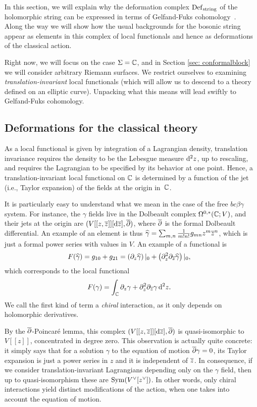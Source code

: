 In this section, we will explain why the deformation complex ${\rm Def}_{\rm string}$ of the holomorphic string 
can be expressed in terms of Gelfand-Fuks cohomology~\cite{Fuks}. 
Along the way we will show how the usual backgrounds for the bosonic string appear as elements in this complex of local functionals and hence as deformations of the classical action. 

Right now, we will focus on the case $\Sigma = \mathbb C$, 
and in Section \ref{sec: conformalblock} we will consider arbitrary Riemann surfaces.
We restrict ourselves to examining {\em translation-invariant} local functionals (which will allow us to descend to a theory defined on an elliptic curve).
Unpacking what this means will lead swiftly to Gelfand-Fuks cohomology.

\subsection{Deformations for the classical theory}

As a local functional is given by integration of a Lagrangian density,
translation invariance requires the density to be the Lebesgue measure ${\rm d}^2 z$, up to rescaling,  
and requires the Lagrangian to be specified by its behavior at one point.
Hence, a translation-invariant local functional on $\mathbb C$ is determined by a function of the jet (i.e., Taylor expansion) of the fields at the origin in~$\mathbb C$. 

It is particularly easy to understand what we mean in the case of the free $bc\beta\gamma$ system.
For instance, the $\gamma$ fields live in the Dolbeault complex $\Omega^{0,*}(\mathbb C ; V)$,
and their jets at the origin are $(V [[z,\overline{z}]] [{\rm d} \overline{z}] , \overline{\partial})$,
where $\overline{\partial}$ is the formal Dolbeault differential. 
An example of an element is thus $\widehat{\gamma} = \sum_{m,n} \frac{1}{m!n!}g_{mn} z^m \overline{z}^n$,
which is just a formal power series with values in $V$.
An example of a functional is
\[
F(\widehat{\gamma}) = g_{10} + g_{21} = \left( \partial_z \widehat{\gamma}\right)|_0 + \left( \partial_z^2 \partial_{\overline{z}} \widehat{\gamma}\right)|_0,
\]
which corresponds to the local functional
\[
F(\gamma) = \int_\mathbb C \partial_z \gamma + \partial_z^2 \partial_{\overline{z}} {\gamma}\,{\rm d}^2 z.
\]
We call the first kind of term a {\em chiral} interaction, as it only depends on holomorphic derivatives.

By the $\overline{\partial}$-Poincar\'{e} lemma, 
this complex $(V [[z,\overline{z}]] [{\rm d} \overline{z}] , \overline{\partial})$ is quasi-isomorphic to $V[[z]]$, concentrated in degree zero. 
This observation is actually quite concrete:
it simply says that for a solution $\gamma$ to the equation of motion $\overline{\partial} \gamma = 0$, 
its Taylor expansion is just a power series in $z$ and it is independent of $\overline{z}$.
In consequence, if we consider translation-invariant Lagrangians depending only on the $\gamma$ field, then up to quasi-isomorphism these are ${\rm Sym}(V^\vee[z^\vee])$.
In other words, only chiral interactions yield distinct modifications of the action,
when one takes into account the equation of motion.

